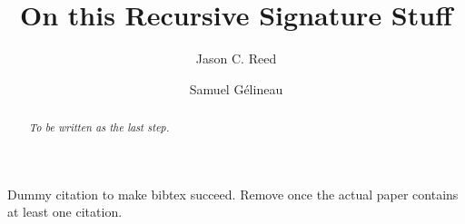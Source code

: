 \documentclass{article}
\title{On this Recursive Signature Stuff}
\author{Jason C. Reed \and Samuel G\'elineau}
\begin{document}
\maketitle

\begin{abstract}\em
To be written as the last step.
\end{abstract}

Dummy citation \cite{kienzle2006challenge} to make bibtex succeed. Remove once the actual paper contains at least one citation.



\end{document}
